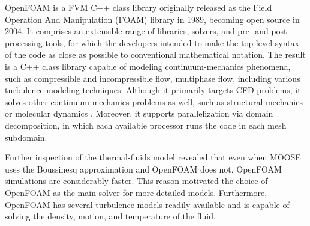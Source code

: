 
OpenFOAM \cite{weller_tensorial_1998} is a \gls*{FVM} C++ class library originally released as the Field Operation And Manipulation (FOAM) library in 1989, becoming open source in 2004.
It comprises an extensible range of libraries, solvers, and pre- and post-processing tools, for which the developers intended to make the top-level syntax of the code as close as possible to conventional mathematical notation.
The result is a C++ class library capable of modeling continuum-mechanics phenomena, such as compressible and incompressible flow, multiphase flow, including various turbulence modeling techniques.
Although it primarily targets \gls*{CFD} problems, it solves other continuum-mechanics problems as well, such as structural mechanics \cite{weller_tensorial_1998} or molecular dynamics \cite{longshaw_mdfoam_2018}.
Moreover, it supports parallelization via domain decomposition, in which each available processor runs the code in each mesh subdomain.

Further inspection of the thermal-fluids model revealed that even when MOOSE uses the Boussinesq approximation and OpenFOAM does not, OpenFOAM simulations are considerably faster.
This reason motivated the choice of OpenFOAM as the main solver for more detailed models.
Furthermore, OpenFOAM has several turbulence models readily available and is capable of solving the density, motion, and temperature of the fluid.


